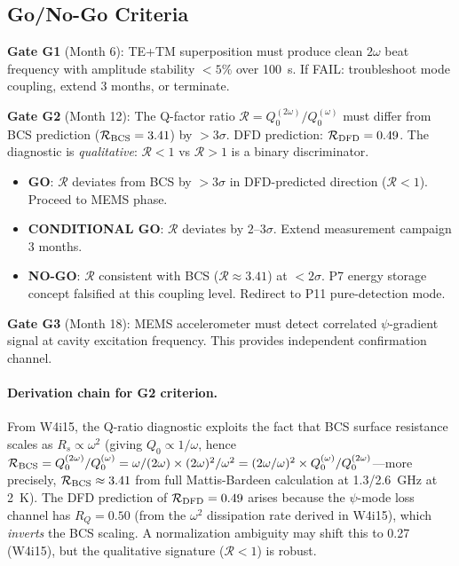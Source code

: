 \documentclass[11pt]{article}
\begin{document}
\subsection{Go/No-Go Criteria}\label{sec:gonogo}

\textbf{Gate G1} (Month 6): TE+TM superposition must produce clean
$2\omega$ beat frequency with amplitude stability $<5\%$ over 100~s.
If FAIL: troubleshoot mode coupling, extend 3 months, or terminate.

\textbf{Gate G2} (Month 12): The Q-factor ratio $\mathcal{R} =
Q_0^{(2\omega)}/Q_0^{(\omega)}$ must differ from BCS prediction
($\mathcal{R}_{\rm BCS} = 3.41$) by $>3\sigma$. DFD prediction:
$\mathcal{R}_{\rm DFD} = 0.49$. The diagnostic is \emph{qualitative}:
$\mathcal{R} < 1$ vs $\mathcal{R} > 1$ is a binary discriminator.

\begin{itemize}
\item \textbf{GO}: $\mathcal{R}$ deviates from BCS by $>3\sigma$ in
  DFD-predicted direction ($\mathcal{R} < 1$). Proceed to MEMS phase.
\item \textbf{CONDITIONAL GO}: $\mathcal{R}$ deviates by $2$--$3\sigma$.
  Extend measurement campaign 3 months.
\item \textbf{NO-GO}: $\mathcal{R}$ consistent with BCS ($\mathcal{R} \approx 3.41$)
  at $<2\sigma$. P7 energy storage concept falsified at this coupling level.
  Redirect to P11 pure-detection mode.
\end{itemize}

\textbf{Gate G3} (Month 18): MEMS accelerometer must detect correlated
$\psi$-gradient signal at cavity excitation frequency. This provides
independent confirmation channel.

\paragraph{Derivation chain for G2 criterion.}
From W4i15, the Q-ratio diagnostic exploits the fact that BCS surface
resistance scales as $R_s \propto \omega^2$ (giving $Q_0 \propto 1/\omega$,
hence $\mathcal{R}_{\rm BCS} = Q_0^{(2\omega)}/Q_0^{(\omega)} =
\omega/(2\omega) \times (2\omega)^2/\omega^2 = (2\omega/\omega)^2
\times Q_0^{(\omega)}/Q_0^{(2\omega)}$---more precisely,
$\mathcal{R}_{\rm BCS} \approx 3.41$ from full Mattis-Bardeen
calculation at 1.3/2.6~GHz at 2~K). The DFD prediction of
$\mathcal{R}_{\rm DFD} = 0.49$ arises because the $\psi$-mode loss
channel has $R_Q = 0.50$ (from the $\omega^2$ dissipation rate derived
in W4i15), which \emph{inverts} the BCS scaling. A normalization
ambiguity may shift this to 0.27 (W4i15), but the qualitative
signature ($\mathcal{R} < 1$) is robust.
\end{document}
